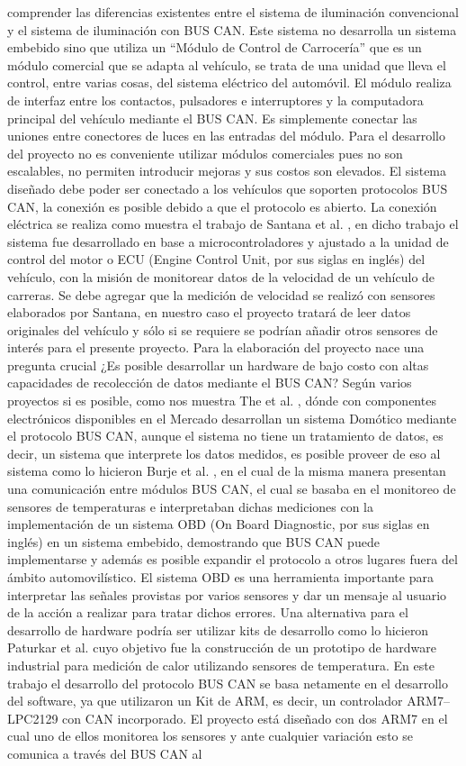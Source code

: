 comprender las diferencias existentes entre el sistema de iluminación convencional y el sistema de iluminación con BUS CAN. Este sistema no desarrolla un sistema embebido sino que utiliza un  “Módulo de Control de Carrocería” que es un módulo comercial que se adapta al vehículo, se trata de una unidad que lleva el control, entre varias cosas, del sistema eléctrico del automóvil. El módulo realiza de interfaz entre los contactos, pulsadores e interruptores y la computadora principal del vehículo mediante el BUS CAN.  Es simplemente conectar las uniones entre conectores de luces en las entradas del módulo. 
Para el desarrollo del proyecto no es conveniente utilizar módulos comerciales pues no son escalables, no permiten introducir mejoras y sus costos son elevados. El sistema diseñado debe poder ser conectado a los vehículos que soporten protocolos BUS CAN, la conexión es posible debido a que el protocolo es abierto. La conexión eléctrica se realiza como muestra el trabajo de Santana et al. \cite{DISM}, en dicho trabajo el sistema fue desarrollado en base a microcontroladores y ajustado a la unidad de control del motor o ECU (Engine Control Unit, por sus siglas en inglés) del vehículo, con la misión de monitorear datos de la velocidad de un vehículo de carreras. Se debe agregar que la medición de velocidad se realizó con sensores elaborados por Santana, en nuestro caso el proyecto tratará de leer datos originales del vehículo y sólo si se requiere se podrían añadir otros sensores de interés para el presente proyecto. Para la elaboración del proyecto nace una pregunta crucial ¿Es posible desarrollar un hardware de bajo costo con altas capacidades de recolección de datos mediante el BUS CAN? Según varios proyectos si es posible,  como nos muestra The et al. \cite{HAMS}, dónde con componentes electrónicos disponibles en el Mercado desarrollan un sistema Domótico mediante el protocolo BUS CAN, aunque el sistema no tiene un tratamiento de datos, es decir, un sistema que interprete los datos medidos, es posible proveer de eso al sistema como lo hicieron  Burje et al. \cite{EOBD}, en el cual de la misma manera presentan una comunicación entre módulos BUS CAN, el cual se basaba en el monitoreo de sensores de temperaturas e interpretaban dichas mediciones con la implementación de un sistema OBD (On Board Diagnostic, por sus siglas en inglés) en un sistema embebido, demostrando que BUS CAN puede implementarse y además es posible expandir el protocolo a otros lugares fuera del ámbito automovilístico. El sistema OBD es una herramienta importante para interpretar las señales provistas por varios sensores y dar un mensaje al usuario de la acción a realizar para tratar dichos errores. Una alternativa para el desarrollo de hardware podría ser utilizar kits de desarrollo como lo hicieron Paturkar et al. \cite{AABT} cuyo objetivo fue la construcción de un prototipo de hardware industrial para medición de calor utilizando sensores de temperatura. En este trabajo el desarrollo del protocolo BUS CAN se basa netamente en el desarrollo del software, ya que utilizaron un Kit de ARM, es decir, un controlador ARM7–LPC2129 con CAN incorporado. El proyecto está diseñado con dos ARM7 en el cual uno de ellos monitorea los sensores y ante cualquier variación esto se comunica a través del BUS CAN al 